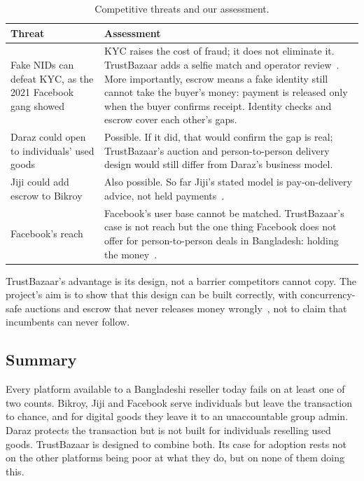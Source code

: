 \begin{table}[H]
  \centering
  \small
  \caption{Competitive threats and our assessment.}
  \label{tab:threats}
  \begin{tabularx}{\textwidth}{@{}>{\raggedright\arraybackslash}p{3.6cm} Y@{}}
    \toprule
    \textbf{Threat} & \textbf{Assessment} \\
    \midrule
    Fake NIDs can defeat KYC, as the 2021 Facebook gang showed~\cite{tbs_fcommerce}
      & KYC raises the cost of fraud; it does not eliminate it. TrustBazaar adds a selfie match and
        operator review~\cite{proposal}. More importantly, escrow means a fake identity still
        cannot take the buyer's money: payment is released only when the buyer confirms
        receipt. Identity checks and escrow cover each other's gaps. \\
    \addlinespace
    Daraz could open to individuals' used goods
      & Possible. If it did, that would confirm the gap is real; TrustBazaar's auction and
        person-to-person delivery design would still differ from Daraz's business model. \\
    \addlinespace
    Jiji could add escrow to Bikroy
      & Also possible. So far Jiji's stated model is pay-on-delivery advice, not held
        payments~\cite{jiji_kenya}. \\
    \addlinespace
    Facebook's reach
      & Facebook's user base cannot be matched. TrustBazaar's case is not reach but the one thing
        Facebook does not offer for person-to-person deals in Bangladesh: holding the
        money~\cite{fs_facebook}. \\
    \bottomrule
  \end{tabularx}
\end{table}

TrustBazaar's advantage is its design, not a barrier competitors cannot copy. The project's aim is to
show that this design can be built correctly,
with concurrency-safe auctions and escrow that never releases money wrongly~\cite{proposal},
not to claim that incumbents can never follow.

\subsection{Summary}

Every platform available to a Bangladeshi reseller today fails on at least one of two counts.
Bikroy, Jiji and Facebook serve individuals but leave the transaction to chance, and for digital
goods they leave it to an unaccountable group admin. Daraz protects the transaction but is not
built for individuals reselling used goods. TrustBazaar is designed to combine both. Its case for adoption
rests not on the other platforms being poor at what they do, but on none of them doing this.
